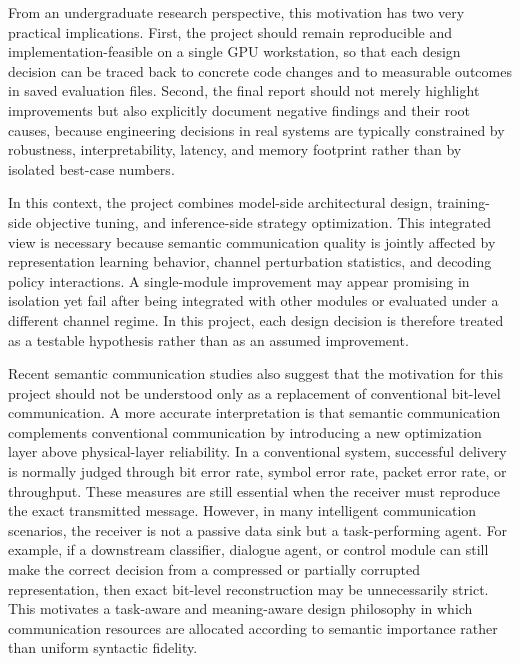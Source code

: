 From an undergraduate research perspective, this motivation has two very practical implications. First, the project should remain reproducible and implementation-feasible on a single GPU workstation, so that each design decision can be traced back to concrete code changes and to measurable outcomes in saved evaluation files. Second, the final report should not merely highlight improvements but also explicitly document negative findings and their root causes, because engineering decisions in real systems are typically constrained by robustness, interpretability, latency, and memory footprint rather than by isolated best-case numbers.

In this context, the project combines model-side architectural design, training-side objective tuning, and inference-side strategy optimization. This integrated view is necessary because semantic communication quality is jointly affected by representation learning behavior, channel perturbation statistics, and decoding policy interactions. A single-module improvement may appear promising in isolation yet fail after being integrated with other modules or evaluated under a different channel regime. In this project, each design decision is therefore treated as a testable hypothesis rather than as an assumed improvement.

Recent semantic communication studies also suggest that the motivation for this project should not be understood only as a replacement of conventional bit-level communication. A more accurate interpretation is that semantic communication complements conventional communication by introducing a new optimization layer above physical-layer reliability. In a conventional system, successful delivery is normally judged through bit error rate, symbol error rate, packet error rate, or throughput. These measures are still essential when the receiver must reproduce the exact transmitted message. However, in many intelligent communication scenarios, the receiver is not a passive data sink but a task-performing agent. For example, if a downstream classifier, dialogue agent, or control module can still make the correct decision from a compressed or partially corrupted representation, then exact bit-level reconstruction may be unnecessarily strict. This motivates a task-aware and meaning-aware design philosophy in which communication resources are allocated according to semantic importance rather than uniform syntactic fidelity.

